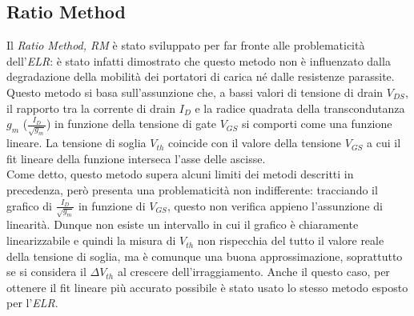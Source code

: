 \subsection{Ratio Method}
Il \emph{Ratio Method, RM} è stato sviluppato per far fronte alle problematicità dell'\emph{ELR}: è stato infatti dimostrato che questo metodo non è influenzato dalla degradazione della mobilità dei portatori di carica né dalle resistenze parassite\cite{art2}. Questo metodo si basa sull'assunzione che, a bassi valori di tensione di drain $V_{DS}$, il rapporto tra la corrente di drain $I_D$ e la radice quadrata della transcondutanza $g_m$ ($\frac{I_D}{\sqrt{g_m}}$) in funzione della tensione di gate $V_{GS}$ si comporti come una funzione lineare. La tensione di soglia $V_{th}$ coincide con il valore della tensione $V_{GS}$ a cui il fit lineare della funzione interseca l'asse delle ascisse.\\
Come detto, questo metodo supera alcuni limiti dei metodi descritti in precedenza, però presenta una problematicità non indifferente: tracciando il grafico di $\frac{I_D}{\sqrt{g_m}}$ in funzione di $V_{GS}$, questo non verifica appieno l'assunzione di linearità. Dunque non esiste un intervallo in cui il grafico è chiaramente linearizzabile e quindi la misura di $V_{th}$ non rispecchia del tutto il valore reale della tensione di soglia, ma è comunque una buona approssimazione, soprattutto se si considera il $\Delta V_{th}$ al crescere dell'irraggiamento.
Anche il questo caso, per ottenere il fit lineare più accurato possibile è stato usato lo stesso metodo esposto per l'\emph{ELR}.


